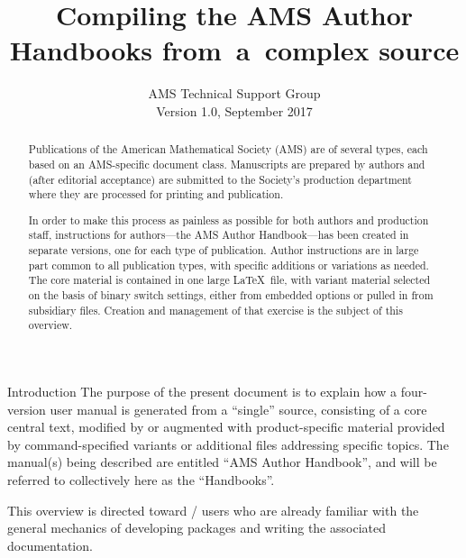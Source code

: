 \documentclass{amsart}
\makeatletter
\renewcommand{\section}{\@startsection{section}{1}%
  \z@{.7\linespacing\@plus\linespacing}{.5\linespacing}%
  {\normalfont\bfseries\centering}}
\makeatother
\begin{document}
\title{Compiling the AMS Author Handbooks from~a~complex source}
\author[AMS Technical Support Group]%
  {AMS Technical Support Group\\Version 1.0, September 2017}

\begin{abstract}
 Publications of the American Mathematical Society (AMS) are of several
 types, each based on an AMS-specific document class.  Manuscripts are
 prepared by authors and (after editorial acceptance) are submitted to
 the Society's production department where they are processed for
 printing and publication.

 In order to make this process as painless as possible for both authors
 and production staff, instructions for authors---the AMS Author
 Handbook---has been created in separate versions, one for each type of
 publication.  Author instructions are in large part common to all
 publication types, with specific additions or variations as needed.
 The core material is contained in one large \LaTeX\ file, with variant
 material selected on the basis of binary switch settings, either from
 embedded options or pulled in from subsidiary files.  Creation and
 management of that exercise is the subject of this overview.
\end{abstract}
\maketitle


\section{Introduction}
\label{sec:intro}
The purpose of the present document is to explain how a four-version
user manual is generated from a ``single'' source, consisting of a
core central text, modified by or augmented with product-specific
material provided by command-specified variants or additional files
addressing specific topics.  The manual(s) being described are entitled
``AMS Author Handbook'', and will be referred to collectively here as
the ``Handbooks''.

This overview is directed toward \latex/ users who are already familiar
with the general mechanics of developing packages and writing the
associated documentation.
\end{document}

